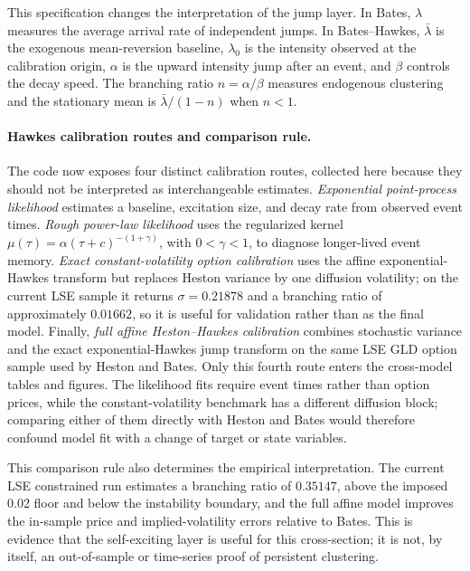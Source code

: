 \documentclass[a4paper,10pt,titlepage,oneside,openany]{book}
\theoremstyle{plain}
\theoremstyle{definition}
\theoremstyle{remark}
\begin{document}
This specification changes the interpretation of the jump layer. In Bates, \(\lambda\) measures the average arrival rate of independent jumps. In Bates--Hawkes, \(\bar{\lambda}\) is the exogenous mean-reversion baseline, \(\lambda_0\) is the intensity observed at the calibration origin, \(\alpha\) is the upward intensity jump after an event, and \(\beta\) controls the decay speed. The branching ratio \(n=\alpha/\beta\) measures endogenous clustering and the stationary mean is \(\bar{\lambda}/(1-n)\) when \(n<1\).

\paragraph{Hawkes calibration routes and comparison rule.}
The code now exposes four distinct calibration routes, collected here because they should not be interpreted as interchangeable estimates. \emph{Exponential point-process likelihood} estimates a baseline, excitation size, and decay rate from observed event times. \emph{Rough power-law likelihood} uses the regularized kernel \(\mu(\tau)=\alpha(\tau+c)^{-(1+\gamma)}\), with \(0<\gamma<1\), to diagnose longer-lived event memory. \emph{Exact constant-volatility option calibration} uses the affine exponential-Hawkes transform but replaces Heston variance by one diffusion volatility; on the current LSE sample it returns \(\sigma=0.21878\) and a branching ratio of approximately \(0.01662\), so it is useful for validation rather than as the final model. Finally, \emph{full affine Heston--Hawkes calibration} combines stochastic variance and the exact exponential-Hawkes jump transform on the same LSE GLD option sample used by Heston and Bates. Only this fourth route enters the cross-model tables and figures. The likelihood fits require event times rather than option prices, while the constant-volatility benchmark has a different diffusion block; comparing either of them directly with Heston and Bates would therefore confound model fit with a change of target or state variables.

This comparison rule also determines the empirical interpretation. The current LSE constrained run estimates a branching ratio of \(0.35147\), above the imposed 0.02 floor and below the instability boundary, and the full affine model improves the in-sample price and implied-volatility errors relative to Bates. This is evidence that the self-exciting layer is useful for this cross-section; it is not, by itself, an out-of-sample or time-series proof of persistent clustering.
\end{document}
